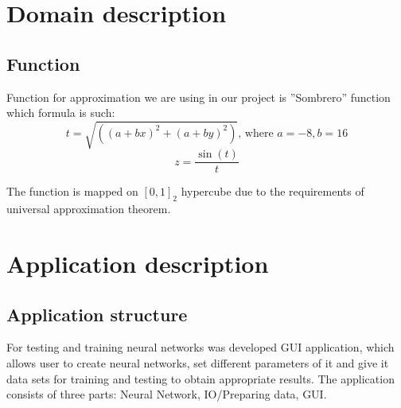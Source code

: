 \documentclass[a4paper,12pt]{article}
\begin{document}
 
\section{Domain description}

\subsection{Function}
Function for approximation we are using in our project is ''Sombrero'' function which formula is such:
\begin{equation}
 t = \sqrt{((a+bx)^2+(a+by)^2)} \text{, where } a = -8, b = 16
 \end{equation}
 \begin{equation}
 z = \frac
 {\sin(t)}
 {t}
\end{equation}

The function is mapped on $[0,1]_2$ hypercube due to the requirements of universal approximation theorem.

\section{Application description}

\subsection{Application structure}

For testing and training neural networks was developed GUI application, which allows user to create neural networks, set different parameters of it and give it data sets for training and  testing to obtain appropriate results. The application consists of three parts: Neural Network, IO/Preparing data, GUI. 
\end{document}
